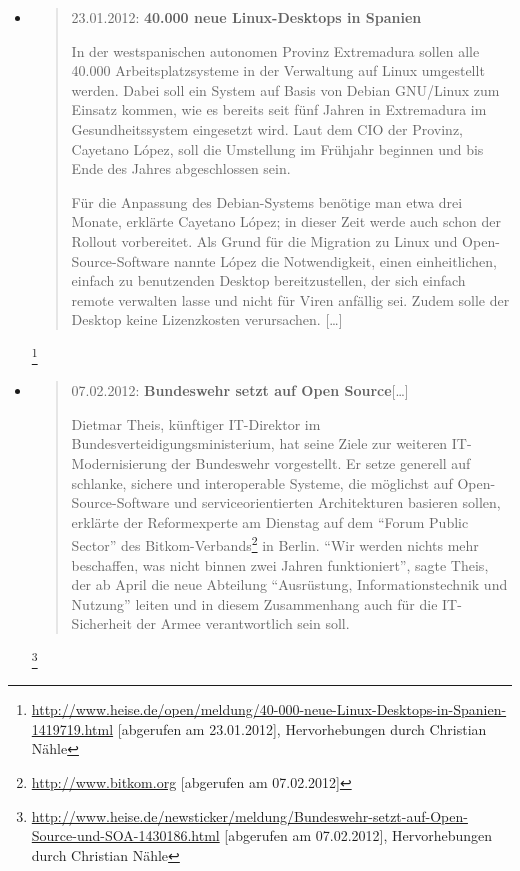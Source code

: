 \documentclass[a4paper]{scrartcl}
\begin{document}
\begin{itemize}
\item \begin{quote}23.01.2012: \textbf{40.000 neue Linux-Desktops in Spanien}

In der westspanischen autonomen Provinz Extremadura sollen alle 40.000
Arbeitsplatzsysteme in der Verwaltung auf Linux umgestellt werden.
Dabei soll ein System auf Basis von Debian GNU/Linux zum Einsatz
kommen, wie es bereits seit fünf Jahren in Extremadura im
Gesundheitssystem eingesetzt wird. Laut dem CIO der Provinz, Cayetano
L\'opez, soll die Umstellung im Frühjahr beginnen und bis Ende des
Jahres abgeschlossen sein.

Für die Anpassung des Debian-Systems benötige man etwa drei Monate,
erklärte Cayetano L\'opez; in dieser Zeit werde auch schon der
Rollout vorbereitet. Als Grund für die Migration zu Linux und
Open-Source-Software nannte L\'opez die Notwendigkeit, einen
einheitlichen, einfach zu benutzenden Desktop bereitzustellen, der sich
einfach remote verwalten lasse und nicht für Viren anfällig sei.
Zudem solle der Desktop keine Lizenzkosten verursachen.
[\ldots]\end{quote}\footnote{\url{http://www.heise.de/open/meldung/40-000-neue-Linux-Desktops-in-Spanien-1419719.html}{
[abgerufen am 23.01.2012],} Hervorhebungen durch Christian
Nähle}

\item \begin{quote}07.02.2012: \textbf{Bundeswehr setzt auf Open Source}[\ldots]

    Dietmar Theis, künftiger IT-Direktor im Bundesverteidigungsministerium, hat
    seine Ziele zur weiteren IT-Modernisierung der Bundeswehr vorgestellt. Er
    setze generell auf schlanke, sichere und interoperable Systeme, die
    möglichst auf Open-Source-Software und serviceorientierten Architekturen
    basieren sollen, erklärte der Reformexperte am Dienstag auf dem ``Forum
    Public Sector'' des
    Bitkom-Verbands\footnote{\href{http://www.bitkom.org/}{{http://www.bitkom.org}}
      [abgerufen am 07.02.2012]} in Berlin. ``Wir werden nichts mehr beschaffen,
    was nicht binnen zwei Jahren funktioniert'', sagte Theis, der ab April die
    neue Abteilung ``Ausrüstung, Informationstechnik und Nutzung'' leiten und in
    diesem Zusammenhang auch für die IT-Sicherheit der Armee verantwortlich sein
    soll.
\end{quote}\footnote{\url{http://www.heise.de/newsticker/meldung/Bundeswehr-setzt-auf-Open-Source-und-SOA-1430186.html}
  [abgerufen am 07.02.2012], Hervorhebungen durch Christian Nähle}


\end{itemize}
\end{document}
